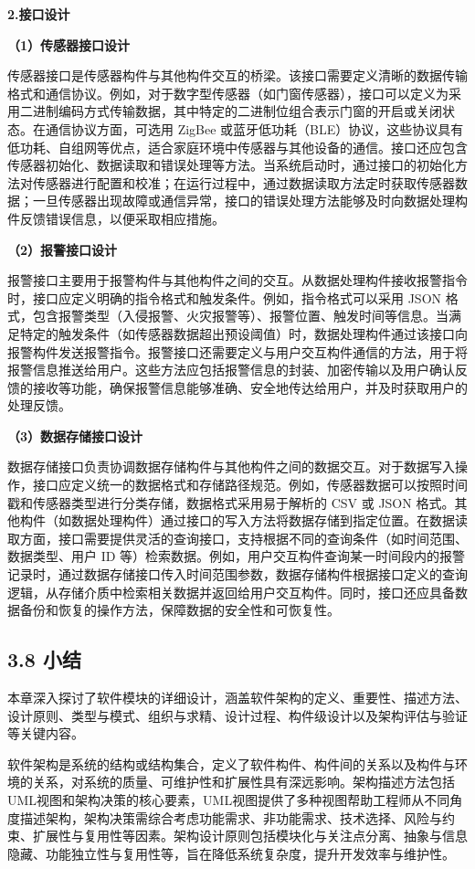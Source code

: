\textbf{2.接口设计}

\textbf{（1）传感器接口设计}

传感器接口是传感器构件与其他构件交互的桥梁。该接口需要定义清晰的数据传输格式和通信协议。例如，对于数字型传感器（如门窗传感器），接口可以定义为采用二进制编码方式传输数据，其中特定的二进制位组合表示门窗的开启或关闭状态。在通信协议方面，可选用 ZigBee 或蓝牙低功耗（BLE）协议，这些协议具有低功耗、自组网等优点，适合家庭环境中传感器与其他设备的通信。接口还应包含传感器初始化、数据读取和错误处理等方法。当系统启动时，通过接口的初始化方法对传感器进行配置和校准；在运行过程中，通过数据读取方法定时获取传感器数据；一旦传感器出现故障或通信异常，接口的错误处理方法能够及时向数据处理构件反馈错误信息，以便采取相应措施。

\textbf{（2）报警接口设计}

报警接口主要用于报警构件与其他构件之间的交互。从数据处理构件接收报警指令时，接口应定义明确的指令格式和触发条件。例如，指令格式可以采用 JSON 格式，包含报警类型（入侵报警、火灾报警等）、报警位置、触发时间等信息。当满足特定的触发条件（如传感器数据超出预设阈值）时，数据处理构件通过该接口向报警构件发送报警指令。报警接口还需要定义与用户交互构件通信的方法，用于将报警信息推送给用户。这些方法应包括报警信息的封装、加密传输以及用户确认反馈的接收等功能，确保报警信息能够准确、安全地传达给用户，并及时获取用户的处理反馈。

\textbf{（3）数据存储接口设计}

数据存储接口负责协调数据存储构件与其他构件之间的数据交互。对于数据写入操作，接口应定义统一的数据格式和存储路径规范。例如，传感器数据可以按照时间戳和传感器类型进行分类存储，数据格式采用易于解析的 CSV 或 JSON 格式。其他构件（如数据处理构件）通过接口的写入方法将数据存储到指定位置。在数据读取方面，接口需要提供灵活的查询接口，支持根据不同的查询条件（如时间范围、数据类型、用户 ID 等）检索数据。例如，用户交互构件查询某一时间段内的报警记录时，通过数据存储接口传入时间范围参数，数据存储构件根据接口定义的查询逻辑，从存储介质中检索相关数据并返回给用户交互构件。同时，接口还应具备数据备份和恢复的操作方法，保障数据的安全性和可恢复性。

\subsection{3.8 小结}\label{ux5c0fux7ed3}

本章深入探讨了软件模块的详细设计，涵盖软件架构的定义、重要性、描述方法、设计原则、类型与模式、组织与求精、设计过程、构件级设计以及架构评估与验证等关键内容。

软件架构是系统的结构或结构集合，定义了软件构件、构件间的关系以及构件与环境的关系，对系统的质量、可维护性和扩展性具有深远影响。架构描述方法包括UML视图和架构决策的核心要素，UML视图提供了多种视图帮助工程师从不同角度描述架构，架构决策需综合考虑功能需求、非功能需求、技术选择、风险与约束、扩展性与复用性等因素。架构设计原则包括模块化与关注点分离、抽象与信息隐藏、功能独立性与复用性等，旨在降低系统复杂度，提升开发效率与维护性。

